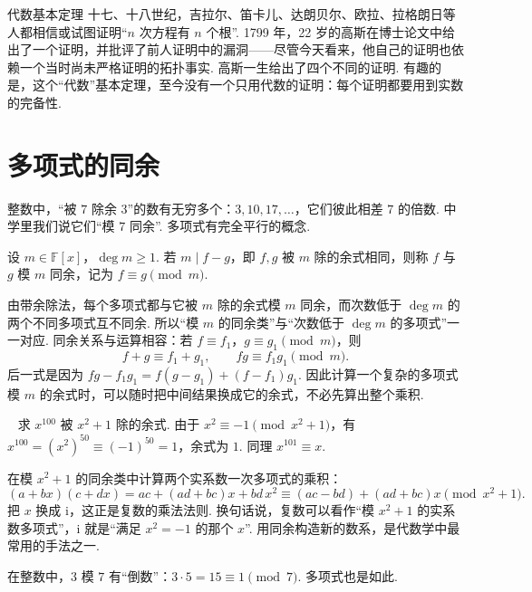 \documentclass[lang=cn,10.5pt,scheme=chinese,toc=twocol,section,chinesefont=nofont,
twoside,citestyle=gb7714-2015,bibstyle=gb7714-2015]{elegantbook}
\DeclareRobustCommand{\textbf}[1]{{\lnsemiboldlatin\lnsemiboldcjk #1}}
\numberwithin{equation}{section}   %
\newcommand{\hC}{\texorpdfstring{\textdaggerdbl}{‡}}
\newcommand*{\lnlabel}[1]{{\sffamily\bfseries\color{black}#1}}
\renewenvironment{example}[1][]{%
	\refstepcounter{exam}%
	\par\noindent\lnlabel{\examplename\ \theexam\ifblank{#1}{}{\ #1}}\ \rmfamily}{%
	\par\ignorespacesafterend}
\begin{document}
\begin{historybox}{代数基本定理}
  十七、十八世纪，吉拉尔、笛卡儿、达朗贝尔、欧拉、拉格朗日等人都相信或试图证明“$n$ 次方程有 $n$ 个根”. 1799 年，22 岁的高斯在博士论文\cite{gauss1799demonstratio}中给出了一个证明，并批评了前人证明中的漏洞——尽管今天看来，他自己的证明也依赖一个当时尚未严格证明的拓扑事实. 高斯一生给出了四个不同的证明. 有趣的是，这个“代数”基本定理，至今没有一个只用代数的证明：每个证明都要用到实数的完备性.
\end{historybox}

\section{\hC 多项式的同余}\label{sec:polycong}

整数中，“被 $7$ 除余 $3$”的数有无穷多个：$3,10,17,\ldots$，它们彼此相差 $7$ 的倍数. 中学里我们说它们“模 $7$ 同余”. 多项式有完全平行的概念.

\begin{definition}
  设 $m\in\mathbb{F}[x]$，$\deg m\ge1$. 若 $m\mid f-g$，即 $f,g$ 被 $m$ 除的余式相同，则称 $f$ 与 $g$ \textbf{模 $m$ 同余}，记为 $f\equiv g\pmod m$.
\end{definition}

由带余除法，每个多项式都与它被 $m$ 除的余式模 $m$ 同余，而次数低于 $\deg m$ 的两个不同多项式互不同余. 所以“模 $m$ 的同余类”与“次数低于 $\deg m$ 的多项式”一一对应. 同余关系与运算相容：若 $f\equiv f_1$，$g\equiv g_1\pmod m$，则
\[f+g\equiv f_1+g_1,\qquad fg\equiv f_1g_1\pmod m.\]
后一式是因为 $fg-f_1g_1=f(g-g_1)+(f-f_1)g_1$. 因此计算一个复杂的多项式模 $m$ 的余式时，可以随时把中间结果换成它的余式，不必先算出整个乘积.

\begin{example}
  求 $x^{100}$ 被 $x^2+1$ 除的余式. 由于 $x^2\equiv-1\pmod{x^2+1}$，有 $x^{100}=(x^2)^{50}\equiv(-1)^{50}=1$，余式为 $1$. 同理 $x^{101}\equiv x$.
\end{example}

\begin{motivebox}
  在模 $x^2+1$ 的同余类中计算两个实系数一次多项式的乘积：
  \[(a+bx)(c+dx)=ac+(ad+bc)x+bd\,x^2\equiv(ac-bd)+(ad+bc)x\pmod{x^2+1}.\]
  把 $x$ 换成 $\mathrm i$，这正是复数的乘法法则. 换句话说，复数可以看作“模 $x^2+1$ 的实系数多项式”，$\mathrm i$ 就是“满足 $x^2=-1$ 的那个 $x$”. 用同余构造新的数系，是代数学中最常用的手法之一.
\end{motivebox}

在整数中，$3$ 模 $7$ 有“倒数”：$3\cdot5=15\equiv1\pmod 7$. 多项式也是如此.
\end{document}
